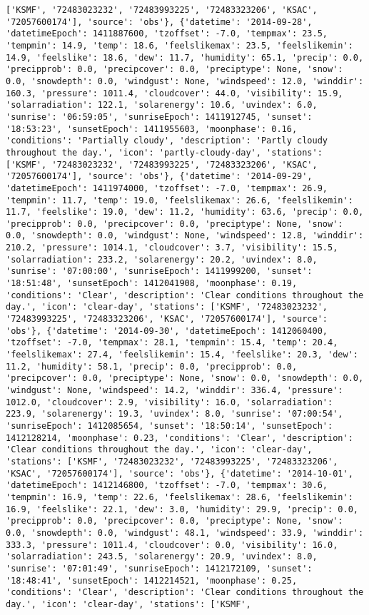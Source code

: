 \documentclass[
  letterpaper,
  DIV=11,
  numbers=noendperiod]{scrartcl}
\begin{document}
\begin{verbatim}
['KSMF', '72483023232', '72483993225', '72483323206', 'KSAC', '72057600174'], 'source': 'obs'}, {'datetime': '2014-09-28', 'datetimeEpoch': 1411887600, 'tzoffset': -7.0, 'tempmax': 23.5, 'tempmin': 14.9, 'temp': 18.6, 'feelslikemax': 23.5, 'feelslikemin': 14.9, 'feelslike': 18.6, 'dew': 11.7, 'humidity': 65.1, 'precip': 0.0, 'precipprob': 0.0, 'precipcover': 0.0, 'preciptype': None, 'snow': 0.0, 'snowdepth': 0.0, 'windgust': None, 'windspeed': 12.0, 'winddir': 160.3, 'pressure': 1011.4, 'cloudcover': 44.0, 'visibility': 15.9, 'solarradiation': 122.1, 'solarenergy': 10.6, 'uvindex': 6.0, 'sunrise': '06:59:05', 'sunriseEpoch': 1411912745, 'sunset': '18:53:23', 'sunsetEpoch': 1411955603, 'moonphase': 0.16, 'conditions': 'Partially cloudy', 'description': 'Partly cloudy throughout the day.', 'icon': 'partly-cloudy-day', 'stations': ['KSMF', '72483023232', '72483993225', '72483323206', 'KSAC', '72057600174'], 'source': 'obs'}, {'datetime': '2014-09-29', 'datetimeEpoch': 1411974000, 'tzoffset': -7.0, 'tempmax': 26.9, 'tempmin': 11.7, 'temp': 19.0, 'feelslikemax': 26.6, 'feelslikemin': 11.7, 'feelslike': 19.0, 'dew': 11.2, 'humidity': 63.6, 'precip': 0.0, 'precipprob': 0.0, 'precipcover': 0.0, 'preciptype': None, 'snow': 0.0, 'snowdepth': 0.0, 'windgust': None, 'windspeed': 12.8, 'winddir': 210.2, 'pressure': 1014.1, 'cloudcover': 3.7, 'visibility': 15.5, 'solarradiation': 233.2, 'solarenergy': 20.2, 'uvindex': 8.0, 'sunrise': '07:00:00', 'sunriseEpoch': 1411999200, 'sunset': '18:51:48', 'sunsetEpoch': 1412041908, 'moonphase': 0.19, 'conditions': 'Clear', 'description': 'Clear conditions throughout the day.', 'icon': 'clear-day', 'stations': ['KSMF', '72483023232', '72483993225', '72483323206', 'KSAC', '72057600174'], 'source': 'obs'}, {'datetime': '2014-09-30', 'datetimeEpoch': 1412060400, 'tzoffset': -7.0, 'tempmax': 28.1, 'tempmin': 15.4, 'temp': 20.4, 'feelslikemax': 27.4, 'feelslikemin': 15.4, 'feelslike': 20.3, 'dew': 11.2, 'humidity': 58.1, 'precip': 0.0, 'precipprob': 0.0, 'precipcover': 0.0, 'preciptype': None, 'snow': 0.0, 'snowdepth': 0.0, 'windgust': None, 'windspeed': 14.2, 'winddir': 336.4, 'pressure': 1012.0, 'cloudcover': 2.9, 'visibility': 16.0, 'solarradiation': 223.9, 'solarenergy': 19.3, 'uvindex': 8.0, 'sunrise': '07:00:54', 'sunriseEpoch': 1412085654, 'sunset': '18:50:14', 'sunsetEpoch': 1412128214, 'moonphase': 0.23, 'conditions': 'Clear', 'description': 'Clear conditions throughout the day.', 'icon': 'clear-day', 'stations': ['KSMF', '72483023232', '72483993225', '72483323206', 'KSAC', '72057600174'], 'source': 'obs'}, {'datetime': '2014-10-01', 'datetimeEpoch': 1412146800, 'tzoffset': -7.0, 'tempmax': 30.6, 'tempmin': 16.9, 'temp': 22.6, 'feelslikemax': 28.6, 'feelslikemin': 16.9, 'feelslike': 22.1, 'dew': 3.0, 'humidity': 29.9, 'precip': 0.0, 'precipprob': 0.0, 'precipcover': 0.0, 'preciptype': None, 'snow': 0.0, 'snowdepth': 0.0, 'windgust': 48.1, 'windspeed': 33.9, 'winddir': 333.3, 'pressure': 1011.4, 'cloudcover': 0.0, 'visibility': 16.0, 'solarradiation': 243.5, 'solarenergy': 20.9, 'uvindex': 8.0, 'sunrise': '07:01:49', 'sunriseEpoch': 1412172109, 'sunset': '18:48:41', 'sunsetEpoch': 1412214521, 'moonphase': 0.25, 'conditions': 'Clear', 'description': 'Clear conditions throughout the day.', 'icon': 'clear-day', 'stations': ['KSMF', 
\end{verbatim}
\end{document}
